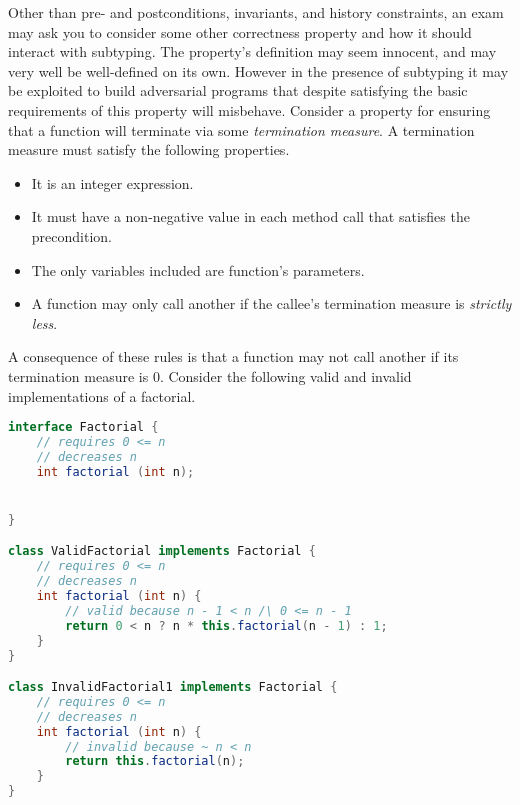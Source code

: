 \documentclass{article}
\begin{document}
\begin{example}
  Other than pre- and postconditions, invariants, and history constraints, an exam may ask you to consider some other correctness property and how it should interact with subtyping.
  The property's definition may seem innocent, and may very well be well-defined on its own.
  However in the presence of subtyping it may be exploited to build adversarial programs that despite satisfying the basic requirements of this property will misbehave.
  Consider a property for ensuring that a function will terminate via some \textit{termination measure}.
  A termination measure must satisfy the following properties.
  \begin{itemize}
  \item It is an integer expression.
  \item It must have a non-negative value in each method call that satisfies the precondition.
  \item The only variables included are function's parameters.
  \item A function may only call another if the callee's termination measure is \textit{strictly less}.
  \end{itemize}
  A consequence of these rules is that a function may not call another if its termination measure is $0$.
  Consider the following valid and invalid implementations of a factorial.
\begin{lstlisting}[language=Java, escapechar=|]
interface Factorial {
    // requires 0 <= n
    // decreases n
    int factorial (int n);


}

class ValidFactorial implements Factorial {
    // requires 0 <= n
    // decreases n
    int factorial (int n) {
        // valid because n - 1 < n /\ 0 <= n - 1
        return 0 < n ? n * this.factorial(n - 1) : 1;
    }
}

class InvalidFactorial1 implements Factorial {
    // requires 0 <= n
    // decreases n
    int factorial (int n) {
        // invalid because ~ n < n
        return this.factorial(n);
    }
}


\end{lstlisting}
\end{example}
\end{document}

